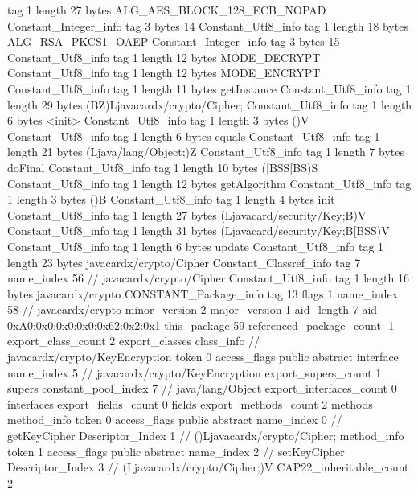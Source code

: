 {{{			tag	1
			length	27
			bytes	ALG_AES_BLOCK_128_ECB_NOPAD
		}
		Constant_Integer_info {
			tag	3
			bytes	14
		}
		Constant_Utf8_info {
			tag	1
			length	18
			bytes	ALG_RSA_PKCS1_OAEP
		}
		Constant_Integer_info {
			tag	3
			bytes	15
		}
		Constant_Utf8_info {
			tag	1
			length	12
			bytes	MODE_DECRYPT
		}
		Constant_Utf8_info {
			tag	1
			length	12
			bytes	MODE_ENCRYPT
		}
		Constant_Utf8_info {
			tag	1
			length	11
			bytes	getInstance
		}
		Constant_Utf8_info {
			tag	1
			length	29
			bytes	(BZ)Ljavacardx/crypto/Cipher;
		}
		Constant_Utf8_info {
			tag	1
			length	6
			bytes	<init>
		}
		Constant_Utf8_info {
			tag	1
			length	3
			bytes	()V
		}
		Constant_Utf8_info {
			tag	1
			length	6
			bytes	equals
		}
		Constant_Utf8_info {
			tag	1
			length	21
			bytes	(Ljava/lang/Object;)Z
		}
		Constant_Utf8_info {
			tag	1
			length	7
			bytes	doFinal
		}
		Constant_Utf8_info {
			tag	1
			length	10
			bytes	([BSS[BS)S
		}
		Constant_Utf8_info {
			tag	1
			length	12
			bytes	getAlgorithm
		}
		Constant_Utf8_info {
			tag	1
			length	3
			bytes	()B
		}
		Constant_Utf8_info {
			tag	1
			length	4
			bytes	init
		}
		Constant_Utf8_info {
			tag	1
			length	27
			bytes	(Ljavacard/security/Key;B)V
		}
		Constant_Utf8_info {
			tag	1
			length	31
			bytes	(Ljavacard/security/Key;B[BSS)V
		}
		Constant_Utf8_info {
			tag	1
			length	6
			bytes	update
		}
		Constant_Utf8_info {
			tag	1
			length	23
			bytes	javacardx/crypto/Cipher
		}
		Constant_Classref_info {
			tag	7
			name_index	56		// javacardx/crypto/Cipher
		}
		Constant_Utf8_info {
			tag	1
			length	16
			bytes	javacardx/crypto
		}
		CONSTANT_Package_info {
			tag	13
			flags	1
			name_index	58		// javacardx/crypto
			minor_version	2
			major_version	1
			aid_length	7
			aid	0xA0:0x0:0x0:0x0:0x62:0x2:0x1
		}
	}
	this_package	59
	referenced_package_count	-1
	export_class_count	2
	export_classes {
		class_info {		// javacardx/crypto/KeyEncryption
			token	0
			access_flags	public abstract interface
			name_index	5		// javacardx/crypto/KeyEncryption
			export_supers_count	1
			supers {
				constant_pool_index	7		// java/lang/Object
			}
			export_interfaces_count	0
			interfaces {
			}
			export_fields_count	0
			fields {
			}
			export_methods_count	2
			methods {
				method_info {
					token	0
					access_flags	public abstract
					name_index	0		// getKeyCipher
					Descriptor_Index	1		// ()Ljavacardx/crypto/Cipher;
				}
				method_info {
					token	1
					access_flags	public abstract
					name_index	2		// setKeyCipher
					Descriptor_Index	3		// (Ljavacardx/crypto/Cipher;)V
				}
			}
			CAP22_inheritable_count	2
}}}
